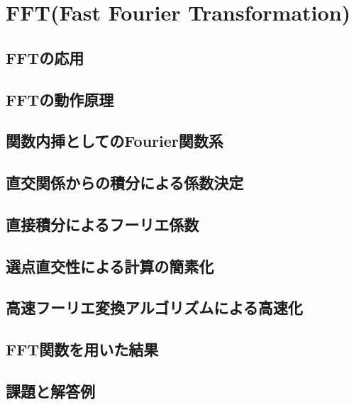 \documentclass[10pt,a4j]{jreport}
\begin{document}
\chapter{FFT(Fast Fourier Transformation)}
\section{FFTの応用}

\section{FFTの動作原理}

\section{関数内挿としてのFourier関数系}

\section{直交関係からの積分による係数決定}

\section{直接積分によるフーリエ係数}

\section{選点直交性による計算の簡素化}

\section{高速フーリエ変換アルゴリズムによる高速化}

\section{FFT関数を用いた結果}

\section{課題と解答例}

\end{document}
